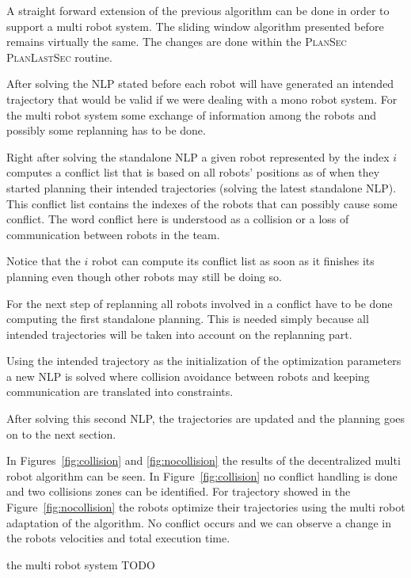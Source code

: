 \documentclass[eprint]{actapoly}
\begin{document}
A straight forward extension of the previous algorithm can be done in order to
support a multi robot system. The sliding window algorithm presented before 
remains
virtually the same. The changes are done within the {\scshape PlanSec} 
{\scshape PlanLastSec} routine.

After solving the NLP stated before each robot will have generated an intended 
trajectory that would be valid
if we were dealing with a mono robot system.
For the multi robot system some exchange of information among the robots and 
possibly some replanning has to be done.

Right after solving the standalone NLP a given robot represented by the index 
$i$ computes a conflict list that is based on 
all robots' positions as of when they started planning their intended 
trajectories (solving the latest standalone NLP).
This conflict list contains the indexes of
the robots  that can possibly cause some conflict. The word 
conflict here is understood as a collision or a loss of communication
between robots in the team.

Notice that the $i$ robot can compute its conflict list as soon as it finishes 
its planning even though other robots may still be doing so.

For the next step of replanning all robots involved in a conflict have to be 
done computing the first standalone planning. This is needed simply because
all intended trajectories will be taken into account on the replanning part.

Using the intended trajectory as the initialization of the optimization 
parameters a new NLP is solved where collision avoidance between robots
and keeping communication are translated into constraints.

After solving this second NLP, the trajectories are updated and the planning 
goes on to the next section.

In Figures~\ref{fig:collision} and \ref{fig:nocollision} the results of the 
decentralized multi robot algorithm can be seen.
In Figure~\ref{fig:collision} no conflict handling is done and two collisions 
zones can be identified.
For trajectory showed in the Figure~\ref{fig:nocollision} the robots optimize 
their trajectories using the multi robot
adaptation of the algorithm. No conflict occurs and we can observe a change in 
the robots velocities and total execution time.


the multi robot system TODO  \centering
\end{document}
